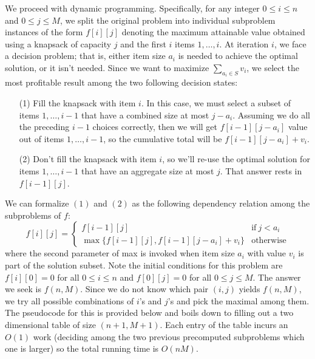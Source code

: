 \documentclass[10pt, letterpaper]{article}
\begin{document}
\begin{enumerate}[label={\bfseries Q\arabic*.}]
\begin{enumerate}
        We proceed with dynamic programming. Specifically, for any integer $0 \leq i \leq n$ and $0 \leq
        j \leq M$, we split the original problem into individual subproblem instances of the form $f[i][j]$
        denoting the maximum attainable value obtained using a knapsack of capacity $j$ and the first $i$
        items $1, \ldots, i$. At iteration $i$, we face a decision problem; that is, either item size $a_i$
        is needed to achieve the optimal solution, or it isn't needed. Since we want to maximize $\sum_{a_i
        \in S} v_i$, we select the most profitable result among the two following decision states:

        \begin{itemize}
          \item[(1)]
            Fill the knapsack with item $i$. In this case, we must select a subset of items $1, \ldots, i-1$
            that have a combined size at most $j - a_i$. Assuming we do all the preceding $i-1$ choices correctly,
            then we will get $f[i-1][j-a_i]$ value out of items $1, \ldots, i-1$, so the cumulative total
            will be $f[i-1][j-a_i] + v_i$.

          \item[(2)]
            Don't fill the knapsack with item $i$, so we'll re-use the optimal solution for items $1,
            \ldots, i-1$ that have an aggregate size at most $j$. That answer rests in $f[i-1][j]$.
        \end{itemize}

        We can formalize $(1)$ and $(2)$ as the following dependency relation among the subproblems of $f$:
        \[
          f[i][j] =
            \begin{cases}
              f[i-1][j] & \text{if}\ j < a_i \\
              \max\big\{f[i-1][j], f[i-1][j-a_i] + v_i\big\} & \text{otherwise}
            \end{cases}
        \]
        where the second parameter of max is invoked when item size $a_i$ with value $v_i$ is part
        of the solution subset. Note the initial conditions for this problem are $f[i][0] = 0$ for
        all $0 \leq i \leq n$ and $f[0][j] = 0$ for all $0 \leq j \leq M$. The answer we seek is
        $f(n, M)$. Since we do not know which pair $(i,j)$ yields $f(n, M)$, we try all possible
        combinations of $i$'s and $j$'s and pick the maximal among them. The pseudocode for this is
        provided below and boils down to filling out a two dimensional table of size $(n+1, M+1)$.
        Each entry of the table incurs an $O(1)$ work (deciding among the two previous precomputed
        subproblems which one is larger) so the total running time is $O(nM)$.


\end{enumerate}
\end{enumerate}
\end{document}
